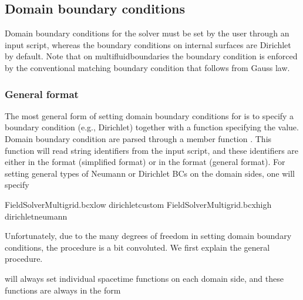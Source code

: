 \documentclass[letterpaper,10pt,english]{sphinxmanual}
\begin{document}
\subsection{Domain boundary conditions}
\label{\detokenize{Solvers/Electrostatics:domain-boundary-conditions}}\label{\detokenize{Solvers/Electrostatics:chap-poissondomainbc}}
Domain boundary conditions for the solver must be set by the user through an input script, whereas the boundary conditions on internal surfaces are Dirichlet by default.
Note that on multifluid\sphinxhyphen{}boundaries the boundary condition is enforced by the conventional matching boundary condition that follows from Gauss\textasciigrave{} law.


\subsubsection{General format}
\label{\detokenize{Solvers/Electrostatics:general-format}}
The most general form of setting domain boundary conditions for  is to specify a boundary condition  (e.g., Dirichlet) together with a function specifying the value.
Domain boundary condition  are parsed through a member function .
This function will read string identifiers from the input script, and these identifiers are either in the format  (simplified format) or in the format  (general format).
For setting general types of Neumann or Dirichlet BCs on the domain sides, one will specify

\begin{sphinxVerbatim}[commandchars=\\\{\},formatcom=\scriptsize]
FieldSolverMultigrid.bc\PYGZus{}x\PYGZus{}low   dirichlet\PYGZus{}custom
FieldSolverMultigrid.bc\PYGZus{}x\PYGZus{}high  dirichlet\PYGZus{}neumann
\end{sphinxVerbatim}

Unfortunately, due to the many degrees of freedom in setting domain boundary conditions, the procedure is a bit convoluted.
We first explain the general procedure.

 will always set individual space\sphinxhyphen{}time functions on each domain side, and these functions are always in the form
\end{document}
